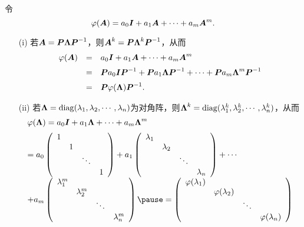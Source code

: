 \begin{frame}
\begin{jielun}
  令
  $$
  \varphi(\boldsymbol{A}) = a_0 \boldsymbol{I} + a_1 \boldsymbol{A} + \cdots + a_m \boldsymbol{A}^m.
  $$ \pause 
  \begin{itemize}
  \item[(i)]
    若$\boldsymbol{A} = \boldsymbol{P} \boldsymbol{\Lambda} \boldsymbol{P}^{-1}$，则$\boldsymbol{A}^k = \boldsymbol{P} \boldsymbol{\Lambda}^k \boldsymbol{P}^{-1}$，从而
    $$
    \begin{array}{rcl}
      \varphi(\boldsymbol{A}) &=& a_0 \boldsymbol{I} + a_1 \boldsymbol{A} + \cdots + a_m \boldsymbol{A}^m \\[0.2cm]
                  &=& \boldsymbol{P} a_0 \boldsymbol{I} \boldsymbol{P}^{-1} + \boldsymbol{P} a_1 \boldsymbol{\Lambda}\boldsymbol{P}^{-1} + \cdots + \boldsymbol{P} a_m \boldsymbol{\Lambda}^m \boldsymbol{P}^{-1} \\[0.2cm]
                  &=& \boldsymbol{P} \varphi(\boldsymbol{\Lambda}) \boldsymbol{P}^{-1}.
    \end{array}
    $$ \pause 
  \item[(ii)] 若$\boldsymbol{\Lambda}=\mathrm{diag}(\lambda_1,\lambda_2,\cdots,\lambda_n)$为对角阵，则$\boldsymbol{\Lambda}^k=\mathrm{diag}(\lambda_1^k,\lambda_2^k,\cdots,\lambda_n^k)$，从而
    $$
    \begin{array}{l}
      \varphi(\MLambda) = a_0 \MI + a_1 \MLambda + \cd + a_m \MLambda^m \\[0.2cm]
      =  a_0 \left(
      \begin{array}{cccc}
        1 & & &\\
          & 1 & & \\
          & & \dd & \\
          & & & 1
      \end{array}
                \right)
                + a_1 \left(
                \begin{array}{cccc}
                  \lambda_1 & & &\\
                            & \lambda_2 & & \\
                            & & \dd & \\
                            & & & \lambda_n
                \end{array}
                                  \right) + \cd \\[0.2in]
      +  a_m \left(
      \begin{array}{cccc}
        \lambda_1^m & & &\\
                    & \lambda_2^m & & \\
                    & & \dd & \\
                    & & & \lambda_n^m
      \end{array}
                          \right)  \pause 
      =\left(
      \begin{array}{cccc}
        \varphi(\lambda_1) & & &\\
                           & \varphi(\lambda_2) & & \\
                           & & \dd & \\
                           & & & \varphi(\lambda_n)
      \end{array}
                                 \right)
    \end{array}
    $$
  \end{itemize}


\end{jielun}
\end{frame}